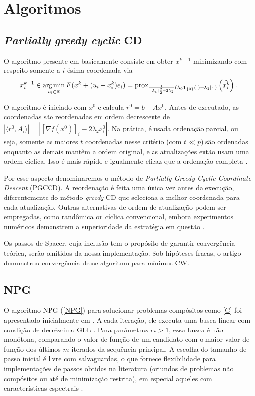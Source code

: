 \section{Algoritmos}
\subsection{\textit{Partially greedy cyclic} CD}
O algoritmo presente em \cite{fastselect} basicamente consiste em obter $x^{k+1}$ minimizando com respeito somente a $i$-ésima coordenada via
\[\begin{aligned}
    x^{k+1}_i\in \operatorname*{arg\,min}_{u_i\in\mathbb{R}}F(x^k+(u_i-x_i^k)e_i)=\operatorname{prox}_{\frac{1}{\|A_i\|^2_2+2\lambda_2}(\lambda_0\mathbf{1}_{\{0\}}(\cdot)+\lambda_1|\cdot|)}\left(\tilde{x_i^k}\right).
\end{aligned}\]

O algoritmo é iniciado com $x^0$ e calcula $r^0 = b - Ax^0$. Antes de executado, as coordenadas são reordenadas em ordem decrescente de $|\langle r^0, A_i \rangle|=|[\nabla f(x^0)]_i-2\lambda_2x^0_i|$. Na prática, é usada ordenação parcial, ou seja, somente as maiores $t$ coordenadas nesse critério (com $t\ll p$) são ordenadas enquanto as demais mantêm a ordem original, e as atualizações então usam uma ordem cíclica. Isso é mais rápido e igualmente eficaz que a ordenação completa \cite{fastselect}. 

Por esse aspecto denominaremos o método de \textit{Partially Greedy Cyclic Coordinate Descent} (PGCCD). A reordenação é feita uma única vez antes da execução, diferentemente do método \textit{greedy} CD que seleciona a melhor coordenada para cada atualização. Outras alternativas de ordem de atualização podem ser empregadas, como randômica ou cíclica convencional, embora experimentos numéricos demonstrem a superioridade da estratégia em questão \cite{fastselect}. 

Os passos de Spacer, cuja inclusão tem o propósito de garantir convergência teórica, serão omitidos da nossa implementação. Sob hipóteses fracas, o artigo demonstrou convergência desse algoritmo para mínimos CW.

\subsection{NPG}
O algoritmo NPG (\autoref{NPG}) para solucionar problemas compósitos como \eqref{C} foi apresentado inicialmente em \cite{kanzow2021}. A cada iteração, ele executa uma busca linear com condição de decréscimo GLL \cite{GLL}. Para parâmetros $m>1$, essa busca é não monótona, comparando o valor de função de um candidato com o maior valor de função dos últimos $m$ iterados da sequência principal. A escolha do tamanho de passo inicial é livre com salvaguardas, o que fornece flexibilidade para implementações de passos obtidos na literatura (oriundos de problemas não compósitos ou até de minimização restrita), em especial aqueles com características espectrais \cite{BB1}. 

